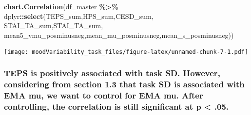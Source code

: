\documentclass[
]{article}
\newenvironment{Shaded}{\begin{snugshade}}{\end{snugshade}}
\newcommand{\FunctionTok}[1]{\textcolor[rgb]{0.13,0.29,0.53}{\textbf{#1}}}
\newcommand{\NormalTok}[1]{#1}
\newcommand{\SpecialCharTok}[1]{\textcolor[rgb]{0.81,0.36,0.00}{\textbf{#1}}}
\begin{document}
\begin{Shaded}
\begin{Highlighting}[]
\FunctionTok{chart.Correlation}\NormalTok{(df\_master }\SpecialCharTok{\%\textgreater{}\%} 
\NormalTok{                    dplyr}\SpecialCharTok{::}\FunctionTok{select}\NormalTok{(TEPS\_sum,HPS\_sum,CESD\_sum, STAI\_TA\_sum,STAI\_TA\_sum,}
\NormalTok{                           mean5\_vmu\_posminusneg,mean\_mu\_posminusneg,mean\_s\_posminusneg))}
\end{Highlighting}
\end{Shaded}

\texttt{[image: moodVariability\_task\_files/figure-latex/unnamed-chunk-7-1.pdf]}

\hypertarget{teps-is-positively-associated-with-task-sd.-however-considering-from-section-1.3-that-task-sd-is-associated-with-ema-mu-we-want-to-control-for-ema-mu.-after-controlling-the-correlation-is-still-significant-at-p-.05.}{%
\subsubsection{TEPS is positively associated with task SD. However,
considering from section 1.3 that task SD is associated with EMA mu, we
want to control for EMA mu. After controlling, the correlation is still
significant at p \textless{}
.05.}\label{teps-is-positively-associated-with-task-sd.-however-considering-from-section-1.3-that-task-sd-is-associated-with-ema-mu-we-want-to-control-for-ema-mu.-after-controlling-the-correlation-is-still-significant-at-p-.05.}}
\end{document}
